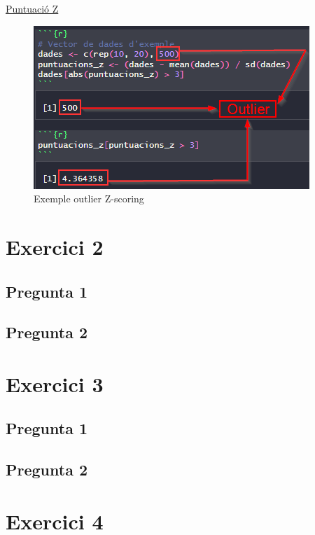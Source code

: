 \documentclass[a4paper,12pt]{report}
\begin{document}
\underline{Puntuació Z}\\
\begin{figure}[h]
    \centering
    \includegraphics[scale=1]{images/z-scoring.png}
    \caption{Exemple outlier Z-scoring}
    \label{fig:zscoring}
\end{figure}
\section*{Exercici 2}

\subsection*{Pregunta 1}

\subsection*{Pregunta 2}

\section*{Exercici 3}

\subsection*{Pregunta 1}

\subsection*{Pregunta 2}

\section*{Exercici 4}
\end{document}
